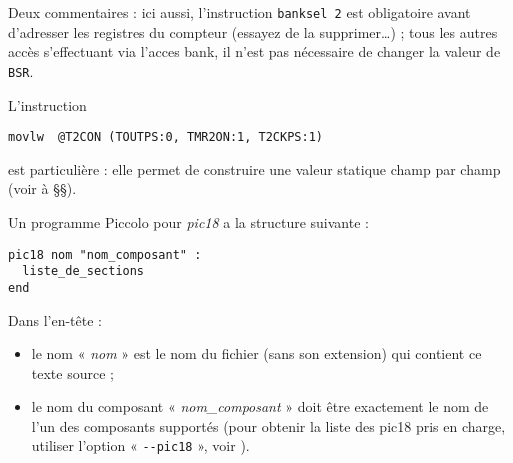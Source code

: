 Deux commentaires : ici aussi, l’instruction \texttt{banksel 2} est obligatoire avant d’adresser les registres du compteur (essayez de la supprimer…) ; tous les autres accès s’effectuant via l’acces bank, il n’est pas nécessaire de changer la valeur de \texttt{BSR}.

L’instruction
\begin{lstlisting}[language=piccolo]
  movlw  @T2CON (TOUTPS:0, TMR2ON:1, T2CKPS:1)
\end{lstlisting}
est particulière : elle permet de construire une valeur statique champ par champ (voir à §§).








Un programme Piccolo pour \emph{pic18} a la structure suivante :

\begin{lstlisting}[language=piccolo]
pic18 nom "nom_composant" :
  liste_de_sections
end
\end{lstlisting}


Dans l’en-tête :
\begin{itemize}
  \item le nom « \emph{nom} » est le nom du fichier (sans son extension) qui contient ce texte source ;
  \item le nom du composant « \emph{nom\_composant} » doit être exactement le nom de l’un des composants supportés (pour obtenir la liste des pic18 pris en charge, utiliser l’option « \texttt{-{}-pic18} », voir ).
\end{itemize}



